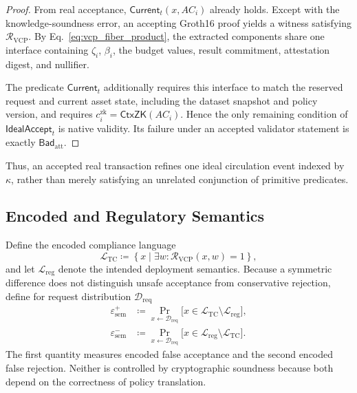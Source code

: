 \documentclass[10pt,journal,compsoc]{IEEEtran}
\begin{document}
\begin{proof}
From real acceptance, $\mathsf{Current}_t(x,AC_i)$ already holds. Except with the knowledge-soundness error, an accepting Groth16 proof yields a witness satisfying $\mathcal{R}_{\mathrm{VCP}}$. By Eq.~\eqref{eq:vcp_fiber_product}, the extracted components share one interface containing $\zeta_i$, $\beta_i$, the budget values, result commitment, attestation digest, and nullifier.

The predicate $\mathsf{Current}_t$ additionally requires this interface to match the reserved request and current asset state, including the dataset snapshot and policy version, and requires $c_i^{\mathrm{zk}}=\mathsf{CtxZK}(AC_i)$. Hence the only remaining condition of $\mathsf{IdealAccept}_t$ is native validity. Its failure under an accepted validator statement is exactly $\mathsf{Bad}_{\mathrm{att}}$.
\end{proof}

Thus, an accepted real transaction refines one ideal circulation event indexed by $\kappa$, rather than merely satisfying an unrelated conjunction of primitive predicates.

\subsection{Encoded and Regulatory Semantics}
\label{subsec:semantic_security}

Define the encoded compliance language
\begin{equation}
\mathcal{L}_{\mathrm{TC}}\coloneqq
\left\{x\mid\exists w:\mathcal{R}_{\mathrm{VCP}}(x,w)=1\right\},
\label{eq:encoded_compliance_language}
\end{equation}
and let $\mathcal{L}_{\mathrm{reg}}$ denote the intended deployment semantics. Because a symmetric difference does not distinguish unsafe acceptance from conservative rejection, define for request distribution $\mathcal{D}_{\mathrm{req}}$
\begin{equation}
\begin{aligned}
\varepsilon_{\mathrm{sem}}^{+}
&\coloneqq
\Pr_{x\leftarrow\mathcal{D}_{\mathrm{req}}}
\bigl[x\in\mathcal{L}_{\mathrm{TC}}\setminus\mathcal{L}_{\mathrm{reg}}\bigr],\\
\varepsilon_{\mathrm{sem}}^{-}
&\coloneqq
\Pr_{x\leftarrow\mathcal{D}_{\mathrm{req}}}
\bigl[x\in\mathcal{L}_{\mathrm{reg}}\setminus\mathcal{L}_{\mathrm{TC}}\bigr].
\end{aligned}
\label{eq:directed_semantic_gap}
\end{equation}
The first quantity measures encoded false acceptance and the second encoded false rejection. Neither is controlled by cryptographic soundness because both depend on the correctness of policy translation.
\end{document}

